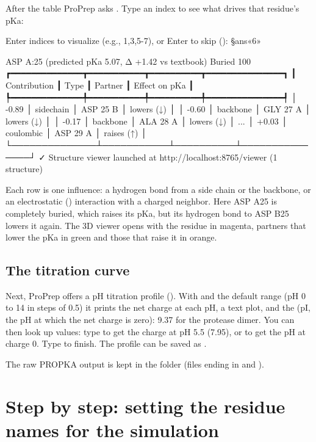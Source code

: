 After the table ProPrep asks
. Type an
index to see what drives that residue's pKa:
\begin{screen}
Enter indices to visualize (e.g., 1,3,5-7), or Enter to skip (): §ans«6»

ASP A:25  (predicted pKa 5.07, Δ +1.42 vs textbook)
  Buried 100 %
┏━━━━━━━━━━━━━━┳━━━━━━━━━━━┳━━━━━━━━━━┳━━━━━━━━━━━━━━━┓
┃ Contribution ┃ Type      ┃ Partner  ┃ Effect on pKa ┃
┡━━━━━━━━━━━━━━╇━━━━━━━━━━━╇━━━━━━━━━━╇━━━━━━━━━━━━━━━┩
│        -0.89 │ sidechain │ ASP 25 B │ lowers (↓)    │
│        -0.60 │ backbone  │ GLY 27 A │ lowers (↓)    │
│        -0.17 │ backbone  │ ALA 28 A │ lowers (↓)    │
...
│        +0.03 │ coulombic │ ASP 29 A │ raises (↑)    │
└──────────────┴───────────┴──────────┴───────────────┘
✓ Structure viewer launched at http://localhost:8765/viewer (1 structure)
\end{screen}
Each row is one influence: a hydrogen bond from a side chain or the backbone,
or an electrostatic () interaction with a charged neighbor.
Here ASP A25 is completely buried, which raises its pKa, but its hydrogen bond
to ASP B25 lowers it again. The 3D viewer opens with the residue in magenta,
partners that lower the pKa in green and those that raise it in orange.

\subsection{The titration curve}

Next, ProPrep offers a pH titration profile
(). With
 and the default range (pH 0 to 14 in steps of 0.5) it prints the net
charge at each pH, a text plot, and the  (pI, the pH at
which the net charge is zero): 9.37 for the protease dimer. You can then look up
values: type  to get the charge at pH 5.5 (7.95), or  to
get the pH at charge 0. Type  to finish. The profile can be saved
as .

The raw PROPKA output is kept in the folder  (files
ending in  and ).

\section{Step by step: setting the residue names for the simulation}
\label{sec:protonation-names}

